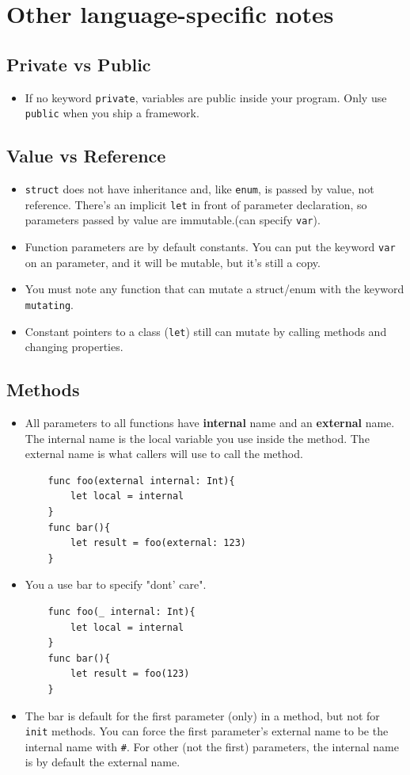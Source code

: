 \documentclass[12pt]{report}
\newcommand{\co}{\texttt}
\begin{document}
\chapter{Other language-specific notes}

\section{Private vs Public}
\begin{itemize}
\item If no keyword \co{private}, variables are public inside your program. Only use \co{public} when you ship a framework.
\end{itemize}

\section{Value vs Reference}
\begin{itemize}
\item \co{struct} does not have inheritance and, like \co{enum}, is passed by value, not reference. There's an implicit \co{let} in front of parameter declaration, so parameters passed by value are immutable.(can specify \co{var}).
\item Function parameters are by default constants. You can put the keyword \co{var} on an parameter, and it will be mutable, but it's still a copy.
\item You must note any function that can mutate a struct/enum with the keyword \co{mutating}.
\item Constant pointers to a class (\co{let}) still can mutate by calling methods and changing properties.
\end{itemize}

\section{Methods}
\begin{itemize}
\item All parameters to all functions have {\bf internal} name and an {\bf external} name. The internal name is the local variable you use inside the method. The external name is what callers will use to call the method.
\begin{lstlisting}
	func foo(external internal: Int){
		let local = internal
	}
	func bar(){
		let result = foo(external: 123)
	}
\end{lstlisting}
\item You a use bar to specify "dont' care". 
\begin{lstlisting}
	func foo(_ internal: Int){
		let local = internal
	}
	func bar(){
		let result = foo(123)
	}
\end{lstlisting}
\item The bar is default for the first parameter (only) in a method, but not for \co{init} methods. You can force the first parameter's external name to be the internal name with \co{\#}. For other (not the first) parameters, the internal name is by default the external name.
\end{itemize}
\end{document}

